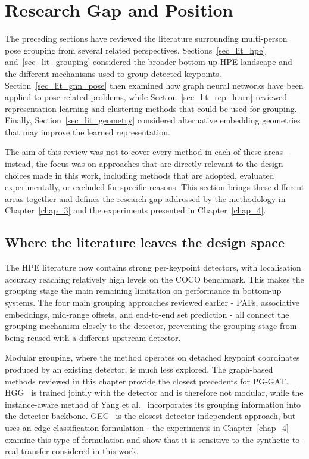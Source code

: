 \section{Research Gap and Position}
\label{sec_lit_gap}

The preceding sections have reviewed the literature surrounding multi-person pose grouping
from several related perspectives.
Sections~\ref{sec_lit_hpe} and~\ref{sec_lit_grouping} considered the broader bottom-up HPE landscape
and the different mechanisms used to group detected keypoints.
Section~\ref{sec_lit_gnn_pose} then examined how graph neural networks have been applied to pose-related problems,
while Section~\ref{sec_lit_rep_learn} reviewed representation-learning and clustering methods
that could be used for grouping.
Finally, Section~\ref{sec_lit_geometry} considered alternative embedding geometries
that may improve the learned representation.

The aim of this review was not to cover every method in each of these areas -
instead, the focus was on approaches that are directly relevant to the design choices made in this work,
including methods that are adopted, evaluated experimentally, or excluded for specific reasons.
This section brings these different areas together
and defines the research gap addressed by the methodology in Chapter~\ref{chap_3}
and the experiments presented in Chapter~\ref{chap_4}.

\subsection{Where the literature leaves the design space}
\label{sec_lit_gap_landscape}

The HPE literature now contains strong per-keypoint detectors,
with localisation accuracy reaching relatively high levels on the COCO benchmark.
This makes the grouping stage the main remaining limitation on performance in bottom-up systems.
The four main grouping approaches reviewed earlier -
PAFs, associative embeddings, mid-range offsets, and end-to-end set prediction -
all connect the grouping mechanism closely to the detector,
preventing the grouping stage from being reused with a different upstream detector.

Modular grouping,
where the method operates on detached keypoint coordinates produced by an existing detector,
is much less explored.
The graph-based methods reviewed in this chapter provide the closest precedents for PG-GAT.
HGG~\cite{jin2020hgg} is trained jointly with the detector and is therefore not modular,
while the instance-aware method of Yang et al.~\cite{yang2023instanceaware}
incorporates its grouping information into the detector backbone.
GEC~\cite{maher2025gec} is the closest detector-independent approach,
but uses an edge-classification formulation -
the experiments in Chapter~\ref{chap_4} examine this type of formulation
and show that it is sensitive to the synthetic-to-real transfer considered in this work.

